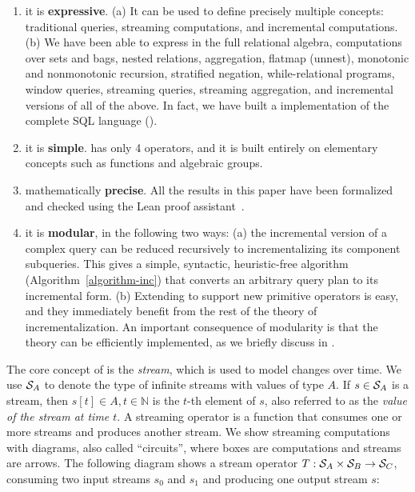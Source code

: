 \begin{enumerate}[nosep, leftmargin=0pt, itemindent=0.5cm, label=\textbf{(\arabic{*})}]
\item it is \textbf{expressive}.  (a) It can be used to define
precisely multiple concepts: traditional queries, streaming computations, and incremental
computations.  (b) We have been able to express in \dbsp the full
relational algebra, computations over sets and bags,
nested relations, aggregation, flatmap (unnest), monotonic and nonmonotonic
recursion, stratified negation, while-relational programs, window queries,
streaming queries, streaming aggregation, and incremental versions of all
of the above.  In fact, we have built a \dbsp implementation of the
complete SQL language ().
\item it is \textbf{simple}.
\dbsp has only 4 operators, and it is built entirely on elementary
concepts such as functions and algebraic groups.
\item mathematically \textbf{precise}.  All the results in this paper
have been formalized and checked using the Lean
proof assistant~\cite{moura-cade15}.
\item it is \textbf{modular}, in the following two ways:
(a) the incremental version of a complex query can be reduced
recursively to incrementalizing its component subqueries.
This gives a simple, syntactic,
heuristic-free algorithm (Algorithm~\ref{algorithm-inc})
that converts an arbitrary \dbsp query plan to its incremental form.
(b) Extending \dbsp to support new primitive operators is easy,
and they immediately benefit from the rest of the theory of
incrementalization.
An important consequence of modularity is that the theory
can be efficiently implemented, as we
briefly discuss in .
\end{enumerate}

The core concept of \dbsp is the \emph{stream}, which is used to model changes
over time. We use $\mathcal{S}_{A}$ to denote the type of infinite streams with values of
type $A$. If $s \in \mathcal{S}_{A}$ is a stream,
then $s[t] \in A, t \in \mathbb{N}$ is the $t$-th element of $s$, also referred to as the \emph{value of the stream at time $t$}.
A streaming operator is a function that
consumes one or more streams and produces another stream.  We show
streaming computations with diagrams, also called ``circuits'',
where boxes are computations and streams are arrows.  The following diagram
shows a stream operator $T: \mathcal{S}_{A} \times \mathcal{S}_{B} \to \mathcal{S}_{C}$,
consuming two input streams $s_0$ and $s_1$
and producing one output stream $s$:

